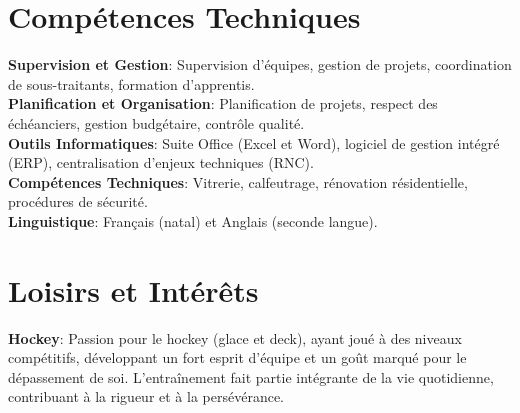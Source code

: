 \documentclass[letterpaper,11pt]{article}
\begin{document}
\section{Compétences Techniques}
 \begin{itemize}[leftmargin=0.15in, label={}]
    \small{\item{
     \textbf{Supervision et Gestion}{: Supervision d'équipes, gestion de projets, coordination de sous-traitants, formation d'apprentis.} \\
     \textbf{Planification et Organisation}{: Planification de projets, respect des échéanciers, gestion budgétaire, contrôle qualité.} \\
     \textbf{Outils Informatiques}{: Suite Office (Excel et Word), logiciel de gestion intégré (ERP), centralisation d'enjeux techniques (RNC).} \\
     \textbf{Compétences Techniques}{: Vitrerie, calfeutrage, rénovation résidentielle, procédures de sécurité.} \\
     \textbf{Linguistique}{: Français (natal) et Anglais (seconde langue).}
    }}
 \end{itemize}

\section{Loisirs et Intérêts}
 \begin{itemize}[leftmargin=0.15in, label={}]
    \small{\item{
     \textbf{Hockey}{: Passion pour le hockey (glace et deck), ayant joué à des niveaux compétitifs, développant un fort esprit d'équipe et un goût marqué pour le dépassement de soi. L'entraînement fait partie intégrante de la vie quotidienne, contribuant à la rigueur et à la persévérance.}
    }}
 \end{itemize}

\end{document}
